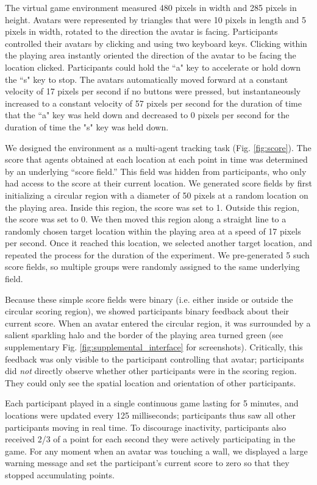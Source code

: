 \documentclass[12pt,letterpaper]{article}
\begin{document}
The virtual game environment measured 480 pixels in width and 285 pixels in height.
Avatars were represented by triangles that were 10 pixels in length and 5 pixels in width, rotated to the direction the avatar is facing. 
Participants controlled their avatars by clicking and using two keyboard keys. 
Clicking within the playing area instantly oriented the direction of the avatar to be facing the location clicked. 
Participants could hold the ``a" key to accelerate or hold down the ``s" key to stop.  
The avatars automatically moved forward at a constant velocity of 17 pixels per second if no buttons were pressed, but instantaneously increased to a constant velocity of 57 pixels per second for the duration of time that the ``a" key was held down and decreased to 0 pixels per second for the duration of time the "s" key was held down. 

We designed the environment as a multi-agent tracking task (Fig. \ref{fig:score}).
The score that agents obtained at each location at each point in time was determined by an underlying ``score field.'' 
This field was hidden from participants, who only had access to the score at their current location. 
We generated score fields by first initializing a circular region with a diameter of 50 pixels at a random location on the playing area. 
Inside this region, the score was set to 1.
Outside this region, the score was set to 0.
We then moved this region along a straight line to a randomly chosen target location within the playing area at a speed of 17 pixels per second.
Once it reached this location, we selected another target location, and repeated the process for the duration of the experiment.
We pre-generated 5 such score fields, so multiple groups were randomly assigned to the same underlying field.  

Because these simple score fields were binary (i.e. either inside or outside the circular scoring region), we showed participants binary feedback about their current score.
When an avatar entered the circular region, it was surrounded by a salient sparkling halo and the border of the playing area turned green (see supplementary Fig. \ref{fig:supplemental_interface} for screenshots). 
Critically, this feedback was only visible to the participant controlling that avatar; participants did \emph{not} directly observe whether other participants were in the scoring region. 
They could only see the spatial location and orientation of other participants.

Each participant played in a single continuous game lasting for 5 minutes, and locations were updated every 125 milliseconds; participants thus saw all other participants moving in real time. 
To discourage inactivity, participants also received 2/3 of a point for each second they were actively participating in the game.
For any moment when an avatar was touching a wall, we displayed a large warning message and set the participant's current score to zero so that they stopped accumulating points.
\end{document}
